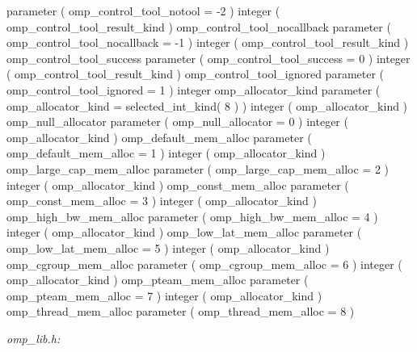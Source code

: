 {\begin{ompfSyntax}
     parameter ( omp_control_tool_notool = -2 )
     integer ( omp_control_tool_result_kind ) omp_control_tool_nocallback
     parameter ( omp_control_tool_nocallback = -1 )
     integer ( omp_control_tool_result_kind ) omp_control_tool_success
     parameter ( omp_control_tool_success = 0 )
     integer ( omp_control_tool_result_kind ) omp_control_tool_ignored
     parameter ( omp_control_tool_ignored = 1 )
     integer omp_allocator_kind
     parameter ( omp_allocator_kind = selected_int_kind( 8 ) )
     integer ( omp_allocator_kind ) omp_null_allocator
     parameter ( omp_null_allocator = 0 )
     integer ( omp_allocator_kind ) omp_default_mem_alloc
     parameter ( omp_default_mem_alloc = 1 )
     integer ( omp_allocator_kind ) omp_large_cap_mem_alloc
     parameter ( omp_large_cap_mem_alloc = 2 )
     integer ( omp_allocator_kind ) omp_const_mem_alloc
     parameter ( omp_const_mem_alloc = 3 )
     integer ( omp_allocator_kind ) omp_high_bw_mem_alloc
     parameter ( omp_high_bw_mem_alloc = 4 )
     integer ( omp_allocator_kind ) omp_low_lat_mem_alloc
     parameter ( omp_low_lat_mem_alloc = 5 )
     integer ( omp_allocator_kind ) omp_cgroup_mem_alloc
     parameter ( omp_cgroup_mem_alloc = 6 )
     integer ( omp_allocator_kind ) omp_pteam_mem_alloc
     parameter ( omp_pteam_mem_alloc = 7 )
     integer ( omp_allocator_kind ) omp_thread_mem_alloc
     parameter ( omp_thread_mem_alloc = 8 )
\end{ompfSyntax}}

\emph{omp\_lib.h:}

